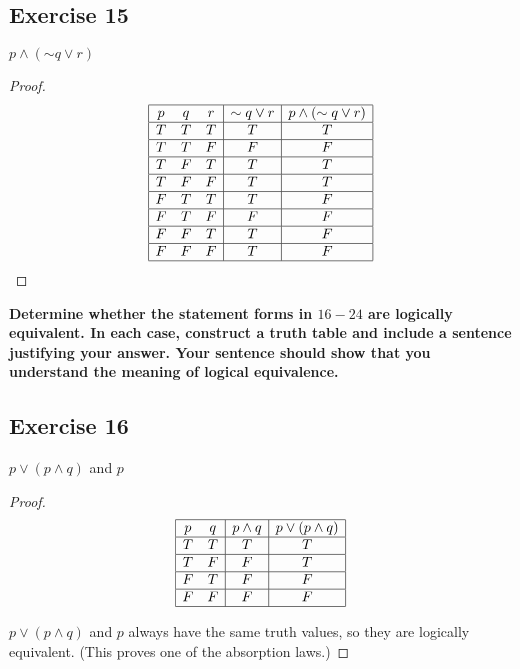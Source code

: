 \documentclass[14pt]{extarticle}
\begin{document}
\subsection{Exercise 15}
$p \wedge ({\sim q} \vee r)$

\begin{proof}
    $$
        \begin{array}{|ccc|c|c|}
            \hline
            p & q & r & {\sim q} \vee r & p \wedge ({\sim q} \vee r) \\ \hline
            T & T & T & T               & T                          \\
            \hline
            T & T & F & F               & F                          \\
            \hline
            T & F & T & T               & T                          \\
            \hline
            T & F & F & T               & T                          \\
            \hline
            F & T & T & T               & F                          \\
            \hline
            F & T & F & F               & F                          \\
            \hline
            F & F & T & T               & F                          \\
            \hline
            F & F & F & T               & F                          \\
            \hline
        \end{array}
    $$
\end{proof}

{\bf Determine whether the statement forms in $16-24$ are logically equivalent. In each case, construct a truth table and include a sentence justifying your answer. Your sentence should show that you understand the meaning of logical equivalence.}

\subsection{Exercise 16}
$p \vee (p \wedge q)$ and $p$

\begin{proof}
    $$
        \begin{array}{|cc|c|c|}
            \hline
            p & q & p \wedge q & p \vee (p \wedge q) \\
            \hline
            T & T & T          & T                   \\
            \hline
            T & F & F          & T                   \\
            \hline
            F & T & F          & F                   \\
            \hline
            F & F & F          & F                   \\
            \hline
        \end{array}
    $$

    $p \vee (p \wedge q)$ and $p$ always have the same truth values, so they are logically equivalent. (This proves one of the absorption laws.)
\end{proof}
\end{document}
